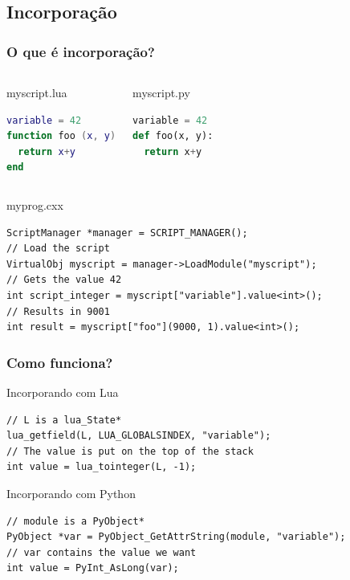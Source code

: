 \documentclass[brazil]{beamer}
\begin{document}
\subsection{Incorporação}
\begin{frame}[fragile]
  \frametitle{O que é incorporação?}
  \pause
  \begin{columns}
      \begin{block}{myscript.lua}
        \begin{lstlisting}[language=lua]
variable = 42
function foo (x, y)
  return x+y
end
        \end{lstlisting}
      \end{block}
    \pause
      \begin{block}{myscript.py}
        \begin{lstlisting}[language=python]
variable = 42
def foo(x, y):
  return x+y
        \end{lstlisting}
      \end{block}
  \end{columns}
  \pause
  \begin{block}{myprog.cxx}
    \begin{lstlisting}
ScriptManager *manager = SCRIPT_MANAGER();
// Load the script
VirtualObj myscript = manager->LoadModule("myscript");
// Gets the value 42
int script_integer = myscript["variable"].value<int>();
// Results in 9001
int result = myscript["foo"](9000, 1).value<int>();
    \end{lstlisting}
  \end{block}
\end{frame}
\begin{frame}[fragile]
  \frametitle{Como funciona?}
  \pause
  \begin{block}{Incorporando com Lua}
    \begin{lstlisting}
// L is a lua_State*
lua_getfield(L, LUA_GLOBALSINDEX, "variable");
// The value is put on the top of the stack
int value = lua_tointeger(L, -1);
    \end{lstlisting}
  \end{block}
  \pause
  \begin{block}{Incorporando com Python}
    \begin{lstlisting}
// module is a PyObject*
PyObject *var = PyObject_GetAttrString(module, "variable");
// var contains the value we want
int value = PyInt_AsLong(var);
    \end{lstlisting}
  \end{block}
\end{frame}
\end{document}
